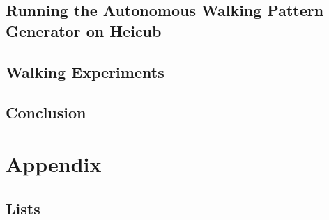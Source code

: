 \documentclass  [
paper    = a4,
BCOR     = 10mm,
twoside,
fontsize = 12pt,
toc      = bibnumbered,
toc      = listofnumbered,
numbers  = noendperiod,
headings = normal,
listof   = leveldown,
version  = 3.03
]                                       {scrreprt}
\begin{document}
	\chapter{Running the Autonomous Walking Pattern Generator on Heicub}
	
	
	\chapter{Walking Experiments}
	
	
	
	
	\chapter{Conclusion}
	
	
	\part{Appendix}
	\begin{appendix}
		\label{sec::a}
		
		
		\chapter{Lists}
		\listoffigures
		\listoftables
		
		
		
		
	\end{appendix}
\end{document}
